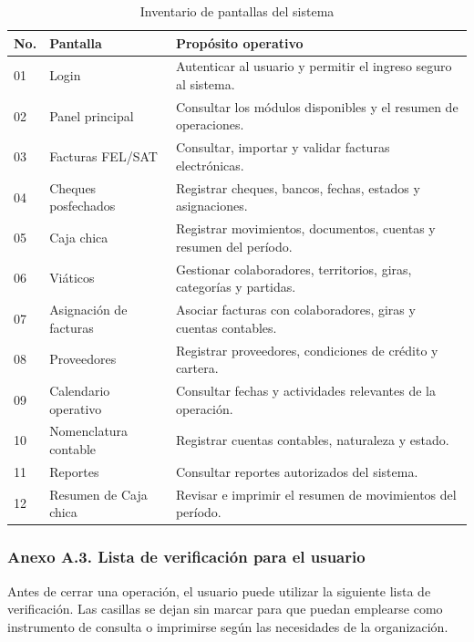 \begin{longtable}{p{1.1cm}p{4.0cm}p{8.1cm}}
\caption{Inventario de pantallas del sistema}\label{tab:A_inventario_pantallas}\\
\toprule
\textbf{No.} & \textbf{Pantalla} & \textbf{Propósito operativo}\\
\midrule
01 & Login & Autenticar al usuario y permitir el ingreso seguro al sistema.\\
02 & Panel principal & Consultar los módulos disponibles y el resumen de operaciones.\\
03 & Facturas FEL/SAT & Consultar, importar y validar facturas electrónicas.\\
04 & Cheques posfechados & Registrar cheques, bancos, fechas, estados y asignaciones.\\
05 & Caja chica & Registrar movimientos, documentos, cuentas y resumen del período.\\
06 & Viáticos & Gestionar colaboradores, territorios, giras, categorías y partidas.\\
07 & Asignación de facturas & Asociar facturas con colaboradores, giras y cuentas contables.\\
08 & Proveedores & Registrar proveedores, condiciones de crédito y cartera.\\
09 & Calendario operativo & Consultar fechas y actividades relevantes de la operación.\\
10 & Nomenclatura contable & Registrar cuentas contables, naturaleza y estado.\\
11 & Reportes & Consultar reportes autorizados del sistema.\\
12 & Resumen de Caja chica & Revisar e imprimir el resumen de movimientos del período.\\
\bottomrule
\end{longtable}

\subsubsection{Anexo A.3. Lista de verificación para el usuario}
Antes de cerrar una operación, el usuario puede utilizar la siguiente lista de verificación. Las casillas se dejan sin marcar para que puedan emplearse como instrumento de consulta o imprimirse según las necesidades de la organización.

